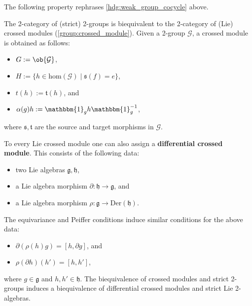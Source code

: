 
    The following property rephrases \cref{hdg:weak_group_cocycle} above.
    \begin{property}
        The 2-category of (strict) 2-groups is biequivalent to the 2-category of (Lie) crossed modules (\cref{group:crossed_module}). Given a 2-group $\mathcal{G}$, a crossed module is obtained as follows:
        \begin{itemize}
            \item $G:=\ob{\mathcal{G}}$,
            \item $H:=\{h\in\mathrm{hom}(\mathcal{G})\mid\mathfrak{s}(f)=e\}$,
            \item $t(h):=\mathfrak{t}(h)$, and
            \item $\alpha(g)h := \mathbbm{1}_gh\mathbbm{1}_g^{-1}$,
        \end{itemize}
        where $\mathfrak{s},\mathfrak{t}$ are the source and target morphisms in $\mathcal{G}$.

        To every Lie crossed module one can also assign a \textbf{differential crossed module}. This consists of the following data:
        \begin{itemize}
            \item two Lie algebras $\mathfrak{g},\mathfrak{h}$,
            \item a Lie algebra morphism $\partial:\mathfrak{h}\rightarrow\mathfrak{g}$, and
            \item a Lie algebra morphism $\rho:\mathfrak{g}\rightarrow\text{Der}(\mathfrak{h})$.
        \end{itemize}
        The equivariance and Peiffer conditions induce similar conditions for the above data:
        \begin{itemize}
            \item $\partial(\rho(h)g) = [h,\partial g]$, and
            \item $\rho(\partial h)(h') = [h,h']$,
        \end{itemize}
        where $g\in\mathfrak{g}$ and $h,h'\in\mathfrak{h}$. The biequivalence of crossed modules and strict 2-groups induces a biequivalence of differential crossed modules and strict Lie 2-algebras.
    \end{property}

